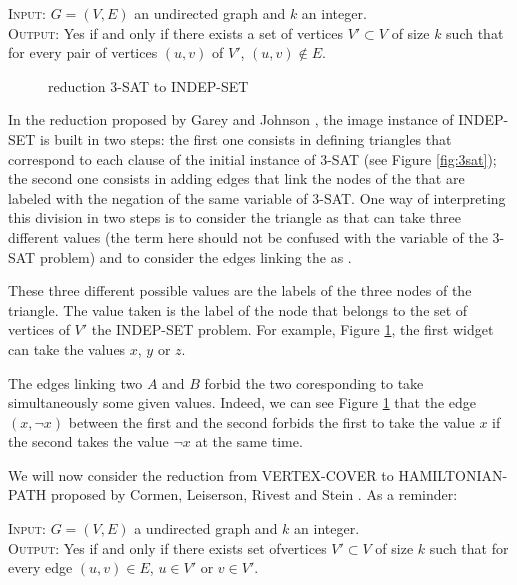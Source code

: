 \begin{definition} 
\textsc{Input:} $G=(V,E)$ an undirected graph and $k$ an integer.\\
\textsc{Output:} Yes if and only if there exists a set of vertices
$V' \subset V$ of size $k$ such that for every pair of vertices
$(u,v)$ of $V'$, $(u,v) \notin E$.\\
\end{definition}

\begin{figure}
  \centering
  
  \caption{reduction 3-SAT to INDEP-SET}
  \label{fig:indep-set}
\end{figure}

In the reduction proposed by Garey and Johnson \cite{garey}, the image
instance of INDEP-SET is built in two steps: the first one consists in
defining triangles that correspond to each clause of the initial
instance of 3-SAT (see Figure \ref{fig:3sat}); the second one consists
in adding edges that link the nodes of the \widgets that are labeled
with the negation of the same variable of 3-SAT. One way of
interpreting this division in two steps is to consider the triangle
\widgets as \variables that can take three different values (the
\variable term here should not be confused with the variable of the
3-SAT problem) and to consider the edges linking the \widgets as
\constraints.

These three different possible values are the labels of the three
nodes of the triangle. The value taken is the label of the node that
belongs to the set of vertices of $V'$ the INDEP-SET problem. For
example, Figure \ref{fig:indep-set}, the first widget can take the
values $x$, $y$ or $z$.

The edges linking two \widgets $A$ and $B$ forbid the two coresponding
\variables to take simultaneously some given values. Indeed, we can
see Figure \ref{fig:indep-set} that the edge $(x, \neg x)$ between the
first and the second \widgets forbids the first \widget to take the
value $x$ if the second takes the value $\neg x$ at the same time.

We will now consider the reduction from VERTEX-COVER to
HAMILTONIAN-PATH proposed by Cormen, Leiserson, Rivest and Stein
\cite{cormen}. As a reminder:

\begin{definition}
  \textsc{Input:} $G=(V,E)$ a undirected graph and $k$ an integer. \\
  \textsc{Output:} Yes if and only if there exists set ofvertices $V'
  \subset V$ of size $k$ such that for every edge $(u,v) \in E$, $u
  \in V'$ or $v \in V'$.\\
\end{definition}

